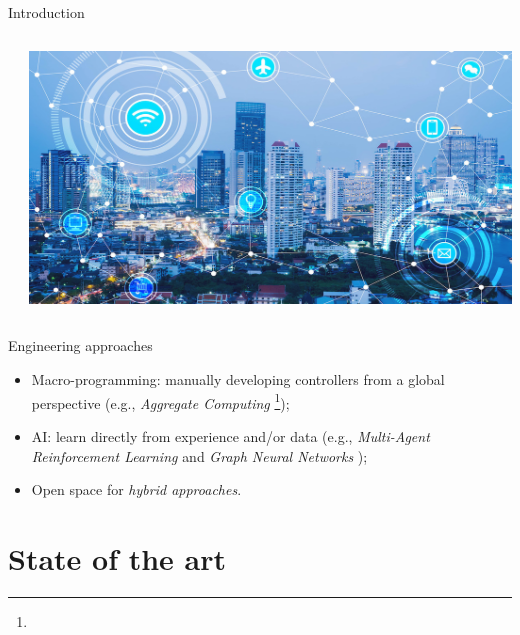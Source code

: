 \documentclass[presentation]{beamer}\mode<presentation>{\usetheme{AMSBolognaFC}}
\begin{document}
\begin{frame}[allowframebreaks]{Introduction}
\begin{columns}
\begin{column}{0.25\textwidth}
	\end{column}
	\begin{column}{0.25\textwidth}
		\includegraphics[width=\textwidth]{img/smartcity2.jpeg}
	\end{column}
\end{columns}

\begin{alertblock}{Engineering approaches}
	\begin{itemize}
		\item Macro-programming: manually developing controllers 
			from a global perspective (e.g., \emph{Aggregate Computing} \footnote{});
		\item AI: learn directly from experience and/or data 
			(e.g., \emph{Multi-Agent Reinforcement Learning} \cite{4445757} and 
			\emph{Graph Neural Networks} \cite{9046288});
		\item Open space for \emph{hybrid approaches}.
	\end{itemize}
\end{alertblock}

\end{frame}


\section{State of the art}
\end{document}
